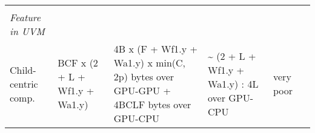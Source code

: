 \documentclass[10pt,oneside]{memoir}
\begin{document}
\begin{longtable}[]{@{}llllll@{}}
\begin{minipage}[t]{0.13\columnwidth}
\strut
\end{minipage} & \begin{minipage}[t]{0.19\columnwidth}\raggedright
\strut
\end{minipage} & \begin{minipage}[t]{0.11\columnwidth}\raggedright
\strut
\end{minipage} & \begin{minipage}[t]{0.12\columnwidth}\raggedright
\strut
\end{minipage}\tabularnewline
\begin{minipage}[t]{0.19\columnwidth}\raggedright
\emph{Feature in UVM}\strut
\end{minipage} & \begin{minipage}[t]{0.10\columnwidth}\raggedright
\strut
\end{minipage} & \begin{minipage}[t]{0.13\columnwidth}\raggedright
\strut
\end{minipage} & \begin{minipage}[t]{0.19\columnwidth}\raggedright
\strut
\end{minipage} & \begin{minipage}[t]{0.11\columnwidth}\raggedright
\strut
\end{minipage} & \begin{minipage}[t]{0.12\columnwidth}\raggedright
\strut
\end{minipage}\tabularnewline
\begin{minipage}[t]{0.19\columnwidth}\raggedright
Child-centric comp.\strut
\end{minipage} & \begin{minipage}[t]{0.10\columnwidth}\raggedright
BCF x (2 + L + Wf1.y + Wa1.y)\strut
\end{minipage} & \begin{minipage}[t]{0.13\columnwidth}\raggedright
4B x (F + Wf1.y + Wa1.y) x min(C, 2p) bytes over GPU-GPU + 4BCLF bytes
over GPU-CPU\strut
\end{minipage} & \begin{minipage}[t]{0.19\columnwidth}\raggedright
\textasciitilde{} (2 + L + Wf1.y + Wa1.y) : 4L over GPU-CPU\strut
\end{minipage} & \begin{minipage}[t]{0.11\columnwidth}\raggedright
very poor\strut
\end{minipage} & \begin{minipage}[t]{0.12\columnwidth}\raggedright
\strut
\end{minipage}\tabularnewline

\end{longtable}
\end{document}
